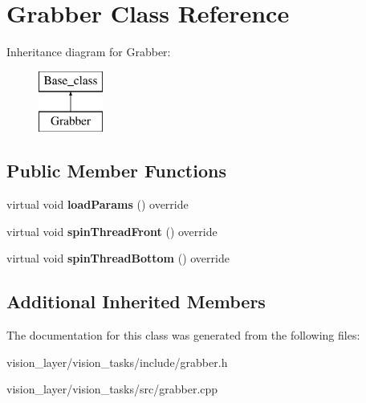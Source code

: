 \hypertarget{classGrabber}{}\section{Grabber Class Reference}
\label{classGrabber}
Inheritance diagram for Grabber\+:\begin{figure}[H]
\begin{center}
\leavevmode
\includegraphics[height=2.000000cm]{classGrabber}
\end{center}
\end{figure}
\subsection*{Public Member Functions}
\begin{DoxyCompactItemize}
\item 
\mbox{\label{classGrabber_a0f7dd26f3bf460ee2ac6aa31be2b69bd}} 
virtual void {\bfseries load\+Params} () override
\item 
\mbox{\label{classGrabber_ac37592916381aef27aecccef5a9d25aa}} 
virtual void {\bfseries spin\+Thread\+Front} () override
\item 
\mbox{\label{classGrabber_a04796f63552146599ed5247bf65efe9d}} 
virtual void {\bfseries spin\+Thread\+Bottom} () override
\end{DoxyCompactItemize}
\subsection*{Additional Inherited Members}


The documentation for this class was generated from the following files\+:\begin{DoxyCompactItemize}
\item 
vision\+\_\+layer/vision\+\_\+tasks/include/grabber.\+h\item 
vision\+\_\+layer/vision\+\_\+tasks/src/grabber.\+cpp\end{DoxyCompactItemize}
